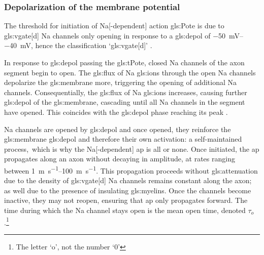 \documentclass[class={myRUCProject}, crop=false]{standalone}
\begin{document}
\subsubsection{Depolarization of the membrane potential}\label{sec:depol}
The threshold for initiation of \gls{Na}[-dependent] action \gls{gls:Pote} is due to \gls{gls:vgate}[d] \gls{Na} channels only opening in response to a \gls{gls:depol} of \qtyrange{-50}{-40}{\mV}, hence the classification `\gls{gls:vgate}[d]' \cite{Hammond2015ch4}. 

In response to \gls{gls:depol} passing the \gls{gls:tPote}, closed \gls{Na} channels of the axon segment begin to open. The \gls{gls:flux} of \gls{Na} \glspl{gls:ion} through the open \gls{Na} channels depolarize the \gls{gls:membrane} more, triggering the opening of additional \gls{Na} channels. 
Consequentially, the \gls{gls:flux} of \gls{Na} \glspl{gls:ion} increases, causing further \gls{gls:depol} of the \gls{gls:membrane}, cascading until all \gls{Na} channels in the segment have opened. 
This coincides with the \gls{gls:depol} phase reaching its peak \cite{Hammond2015ch4}. 

{}\gls{Na} channels are opened by \gls{gls:depol} and once opened, they reinforce the \gls{gls:membrane} \gls{gls:depol} and therefore their own activation: a self-maintained process,\footnotemark~which is why the \gls{Na}[-dependent] \gls{ap} is all or none.
Once initiated, the \gls{ap} propagates along an axon without decaying in amplitude, at rates ranging between \qtyrange{1}{100}{\meter\per\s}. 
This propagation proceeds without \gls{gls:attenuation} due to the density of \gls{gls:vgate}[d] \gls{Na} channels remains constant along the axon; as well due to the presence of insulating \glspl{gls:myelin}. 
Once the channels become inactive, they may not reopen, ensuring that \gls{ap} only propagates forward. 
The time during which the \gls{Na} channel stays open is the mean open time, denoted \(\tau_o\) \cite{Hammond2015ch4}.\footnote{The letter  `o', not the number `0'}
\end{document}
